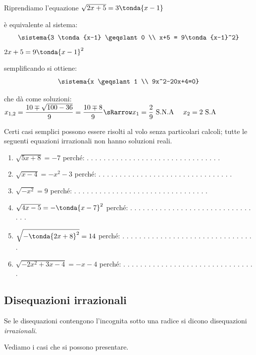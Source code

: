 \begin{esempio}
Riprendiamo l'equazione \(\sqrt{2x+5} = 3 \tonda{x-1}\)
 
 è equivalente al sistema: 
\[\sistema{3 \tonda{x-1} \geqslant 0 \\
           x+5 = 9\tonda{x-1}^2}
\]
\(2x+5 = 9\tonda{x-1}^2\)
 
 semplificando si ottiene: 
\[\sistema{x \geqslant 1 \\
           9x^2-20x+4=0}
\]

 che dà come soluzioni:
 \(x_{1,2} = \dfrac{10 \mp \sqrt{100-36}}{9} = \dfrac{10 \mp 8}{9} \sRarrow 
 x_1 = \dfrac{2}{9} \text{ S.N.A } \quad  x_2 = 2 \text{ S.A}\)
 
\end{esempio}

Certi casi semplici possono essere risolti al volo senza particolari calcoli;
tutte le seguenti equazioni irrazionali non hanno soluzioni reali.

\begin{enumerate}
 \item \(\sqrt{5x +8} = -7\) 
 \hfill perché: . . . . . . . . . . . . . . . . . . . . . . . . . . . . . . . .
 \item \(\sqrt{x-4} = -x^2-3\) 
 \hfill perché: . . . . . . . . . . . . . . . . . . . . . . . . . . . . . . . .
 \item \(\sqrt{-x^2} = 9\)  
 \hfill perché: . . . . . . . . . . . . . . . . . . . . . . . . . . . . . . . .
 \item \(\sqrt{4x-5} = -\tonda{x-7}^2\) 
 \hfill perché: . . . . . . . . . . . . . . . . . . . . . . . . . . . . . . . .
 \item \(\sqrt{-\tonda{2x+8}^2} = 14\) 
 \hfill perché: . . . . . . . . . . . . . . . . . . . . . . . . . . . . . . . .
 \item \(\sqrt{-2x^2 + 3x -4} = -x-4\) 
 \hfill perché: . . . . . . . . . . . . . . . . . . . . . . . . . . . . . . . .
\end{enumerate}

\subsection{Disequazioni irrazionali}
\label{sec:irvalass_irrazionali}

Se le disequazioni contengono l'incognita sotto una radice si dicono 
disequazioni \emph{irrazionali}.

Vediamo i casi che si possono presentare.


